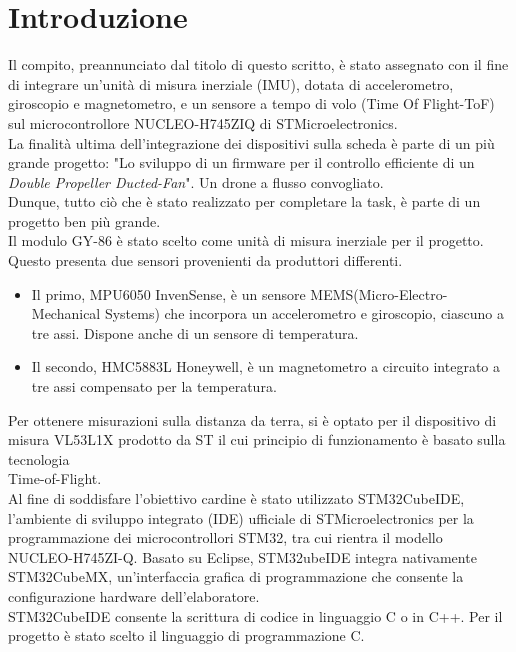 \documentclass[11pt]{report}
\begin{document}
\tableofcontents
{}
\newpage

\pagestyle{plain}

\section*{Introduzione}
Il compito, preannunciato dal titolo di questo scritto, è stato assegnato con il fine di integrare un'unità di misura inerziale (IMU), dotata di accelerometro, giroscopio e magnetometro, e un sensore a tempo di volo (Time Of Flight-ToF) sul microcontrollore  NUCLEO-H745ZIQ di STMicroelectronics.\\
La finalità ultima dell'integrazione dei dispositivi sulla scheda è parte di un più grande progetto: "Lo sviluppo di un firmware per il controllo efficiente di un \textit{Double Propeller Ducted-Fan}". Un drone a flusso convogliato.\\
Dunque, tutto ciò che è stato realizzato per completare la task, è parte di un progetto ben più grande.\\
Il modulo GY-86 è stato scelto come unità di misura inerziale per il progetto. Questo presenta due sensori provenienti da produttori differenti. 
\begin{itemize}
    \item Il primo, MPU6050 InvenSense, è un sensore MEMS(Micro-Electro-Mechanical Systems) che incorpora un accelerometro e giroscopio, ciascuno a tre assi. Dispone anche di un sensore di temperatura.\\
    \item Il secondo, HMC5883L Honeywell, è un magnetometro a circuito integrato a tre assi compensato per la temperatura. 
\end{itemize}
Per ottenere misurazioni sulla distanza da terra, si è optato per il dispositivo di misura VL53L1X prodotto da ST il cui principio di funzionamento è basato sulla tecnologia \\Time-of-Flight.\\
Al fine di soddisfare l'obiettivo cardine  è stato utilizzato STM32CubeIDE, l'ambiente di sviluppo integrato (IDE) ufficiale di STMicroelectronics per la programmazione dei microcontrollori STM32, tra cui rientra il modello  NUCLEO-H745ZI-Q. 
Basato su Eclipse, STM32ubeIDE integra nativamente STM32CubeMX, un'interfaccia grafica di programmazione che consente la configurazione hardware dell'elaboratore.\\
STM32CubeIDE consente la scrittura di codice in linguaggio C o in C++. Per il progetto è stato scelto il linguaggio di programmazione C.
\end{document}
